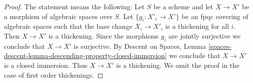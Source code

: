 \documentclass[10pt,a4paper]{amsart}
\theoremstyle{plain}
\theoremstyle{definition}
\theoremstyle{remark}
\numberwithin{equation}{subsection}
\begin{document}
\begin{proof}
The statement means the following: Let $S$ be a scheme and let
$X \to X'$ be a morphism of algebraic spaces over $S$.
Let $\{g_i : X'_i \to X'\}$ be an fpqc covering of algebraic spaces
such that the base change $X_i \to X'_i$ is a thickening for all $i$.
Then $X \to X'$ is a thickening. Since the morphisms $g_i$ are jointly
surjective we conclude that $X \to X'$ is surjective. By
Descent on Spaces, Lemma
\ref{spaces-descent-lemma-descending-property-closed-immersion}
we conclude that $X \to X'$ is a closed immersion.
Thus $X \to X'$ is a thickening. We omit the proof in the
case of first order thickenings.
\end{proof}
\end{document}
